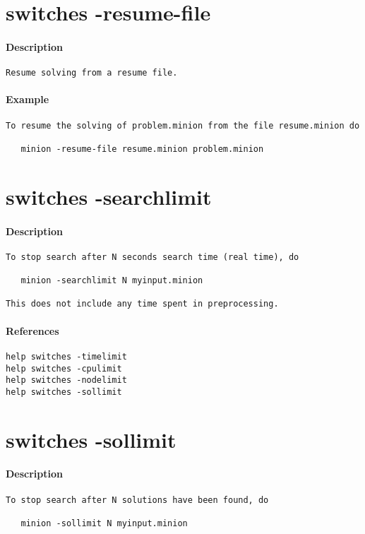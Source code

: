 \section{switches -resume-file}
\paragraph{Description}
{\footnotesize
\begin{verbatim}
Resume solving from a resume file.
\end{verbatim}
}
\paragraph{Example}
{\footnotesize
\begin{verbatim}
To resume the solving of problem.minion from the file resume.minion do

   minion -resume-file resume.minion problem.minion
\end{verbatim}
}
\section{switches -searchlimit}
\paragraph{Description}
{\footnotesize
\begin{verbatim}
To stop search after N seconds search time (real time), do

   minion -searchlimit N myinput.minion

This does not include any time spent in preprocessing.
\end{verbatim}
}
\paragraph{References}
{\footnotesize
\begin{verbatim}
help switches -timelimit
help switches -cpulimit
help switches -nodelimit
help switches -sollimit
\end{verbatim}
}
\section{switches -sollimit}
\paragraph{Description}
{\footnotesize
\begin{verbatim}
To stop search after N solutions have been found, do

   minion -sollimit N myinput.minion
\end{verbatim}
}
